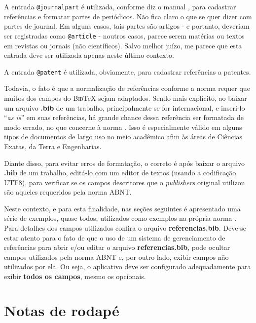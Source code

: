 \begin{apendicesenv}
    A entrada \verb|@journalpart| é utilizada, conforme diz o manual \cite{abnTeX22014d}, para cadastrar referências e formatar partes de periódicos.
    Não fica claro o que se quer dizer com partes de journal.
    Em alguns casos, tais partes são artigos - e portanto, deveriam ser registradas como \verb|@article| - noutros casos, parece serem matérias ou textos em revistas ou jornais (não científicos).
    Salvo melhor juízo, me parece que esta entrada deve ser utilizada apenas neste último contexto.

    A entrada \verb|@patent| é utilizada, obviamente, para cadastrar referências a patentes.

    Todavia, o fato é que a normalização de referências conforme a norma  requer que muitos dos campos do \textsc{Bib}\TeX{} sejam adaptados.
    Sendo mais explícito, ao baixar um arquivo \textbf{.bib} de um trabalho, principalmente se for internacional, e inseri-lo ``\textit{as is}'' em suas referências, há grande chance dessa referência ser formatada de modo errado, no que concerne à norma .
    Isso é especialmente válido em alguns tipos de documentos de largo uso no meio acadêmico afim às áreas de Ciências Exatas, da Terra e Engenharias.

    Diante disso, para evitar erros de formatação, o correto é após baixar o arquivo \textbf{.bib} de um trabalho, editá-lo com um editor de textos (usando a codificação UTF8), para verificar se os campos descritores que o \textit{publishers} original utilizou são aqueles requeridos pela norma ABNT.

    Neste contexto, e para esta finalidade, nas seções seguintes é apresentado uma série de exemplos, quase todos, utilizados como exemplos na própria norma .
    Para detalhes dos campos utilizados confira o arquivo \textbf{referencias.bib}.
    Deve-se estar atento para o fato de que o uso de um sistema de gerenciamento de referências para abrir e/ou editar o arquivo \textbf{referencias.bib}, pode ocultar campos utilizados pela norma ABNT e, por outro lado, exibir campos não utilizados por ela.
    Ou seja, o aplicativo deve ser configurado adequadamente para exibir \textbf{todos os campos}, mesmo os opcionais.

    \section{Notas de rodapé}
    \label{sec_notas_de_rodape}


\end{apendicesenv}
